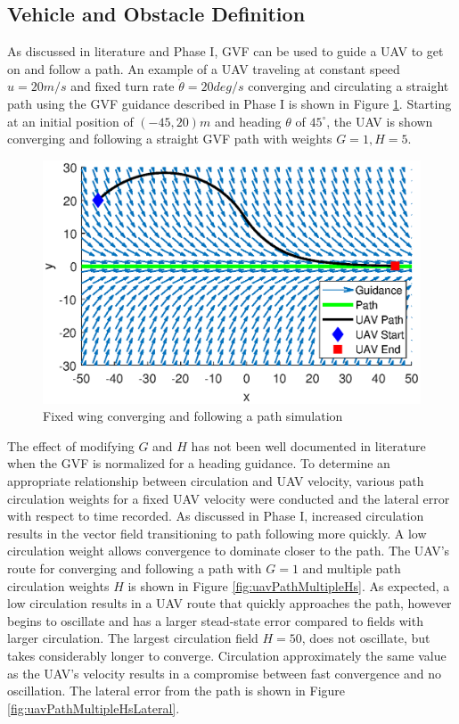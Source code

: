 \documentclass[numbered,pdftex]{ohio-etd}
\begin{document}
\subsection{Vehicle and Obstacle Definition}

As discussed in literature and Phase I, GVF can be used to guide a UAV to get on and follow a path. An example of a UAV traveling at constant speed $u=20m/s$ and fixed turn rate $\dot{\theta}=20deg/s$ converging and circulating a straight path using the GVF guidance described in Phase I is shown in Figure \ref{fig:uavPathFollowDemo}. Starting at an initial position of $(-45,20)m$ and heading $\theta$ of $45^\circ$, the UAV is shown converging and following a straight GVF path with weights $G=1,H=5$.


\begin{figure}[H]
	\centering
	\includegraphics[trim=0 25 0 45,clip,width=14cm]{PaperFigures/Methods/uavPathFollowDemo}
	\caption{Fixed wing converging and following a path simulation}
	\label{fig:uavPathFollowDemo}
\end{figure}

The effect of modifying $G$ and $H$ has not been well documented in literature when the GVF is normalized for a heading guidance. To determine an appropriate relationship between circulation and UAV velocity, various path circulation weights for a fixed UAV velocity were conducted and the lateral error with respect to time recorded. As discussed in Phase I, increased circulation results in the vector field transitioning to path following more quickly. A low circulation weight allows convergence to dominate closer to the path. The UAV's route for converging and following a path with $G=1$ and multiple path circulation weights $H$ is shown in Figure \ref{fig:uavPathMultipleHs}. As expected, a low circulation results in a UAV route that quickly approaches the path, however begins to oscillate and has a larger stead-state error compared to fields with larger circulation. The largest circulation field $H=50$, does not oscillate, but takes considerably longer to converge. Circulation approximately the same value as the UAV's velocity results in a compromise between fast convergence and no oscillation. The lateral error from the path is shown in Figure \ref{fig:uavPathMultipleHsLateral}. 
\end{document}

